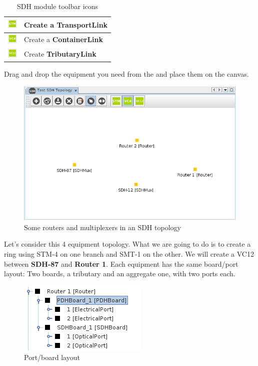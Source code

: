 \documentclass[a4paper]{article}
\begin{document}
\begin{table}[h!]
\begin{tabular}{lp{10cm}}
				\midrule
				\includegraphics[width=0.5cm]{img/sdh_module_transport_link.png} & Create a \textbf{TransportLink} \\
				\midrule
				\includegraphics[width=0.5cm]{img/sdh_module_container_link.png} & Create a \textbf{ContainerLink} \\
				\midrule
				\includegraphics[width=0.5cm]{img/sdh_module_tributary_link.png} & Create \textbf{TributaryLink} \\
			\end{tabular}
			\caption{SDH module toolbar icons}
			\label{tab:sdh_module_icons}
		\end{table}
		
		Drag and drop the equipment you need from the  and place them on the canvas.
		\begin{figure}[h!]
			\centering
			\includegraphics[width=\linewidth]{img/sdh_module_initial_view.png}
			\caption{Some routers and multiplexers in an SDH topology}
			\label{fig:sdh_module_initial_view}
		\end{figure}
		
		Let's consider this 4 equipment topology. What we are going to do is to create a ring using STM-4 on one branch and SMT-1 on the other. We will create a VC12 between \textbf{SDH-87} and \textbf{Router 1}. Each equipment has the same board/port layout: Two boards, a tributary and an aggregate one, with two ports each.
		\begin{figure}[h!]
			\centering
			\includegraphics[width=0.4\linewidth]{img/sdh_module_layout.png}
			\caption{Port/board layout}
			\label{fig:sdh_module_layout}
		\end{figure}
		
\end{document}
